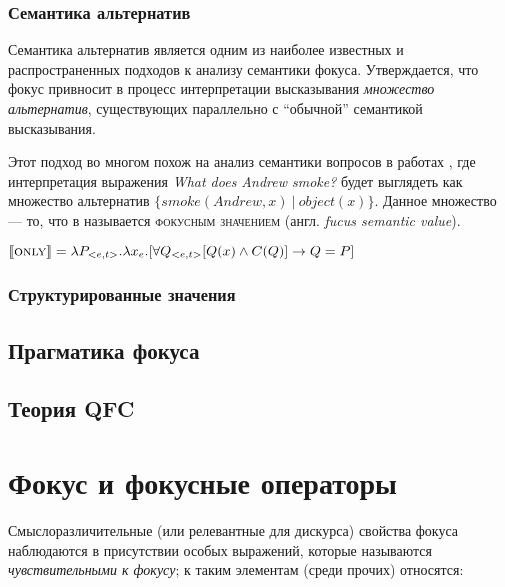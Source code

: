 \documentclass[a4paper, titlepage, 12pt]{article}
\begin{document}
\subsubsection{Семантика альтернатив \citep{rooth1985association,rooth1992theory}} \label{alternativeSemantics}

Семантика альтернатив \citep{rooth1985association,rooth1992theory} является одним из наиболее известных и распространенных подходов к анализу семантики фокуса. Утверждается, что фокус привносит в процесс интерпретации высказывания \textit{множество альтернатив}, существующих параллельно с ``обычной'' семантикой высказывания.

\medskip

Этот подход во многом похож на анализ семантики вопросов в работах \citep{hamblin1973questions,karttunen1977syntax,groenendijk1985semantics}, где интерпретация выражения \textit{What does Andrew smoke?} будет выглядеть как множество альтернатив $ \{ smoke(Andrew, x) \ | \ object(x) \} $. Данное множество --- то, что в \citep{rooth1985association} называется \textsc{фокусным значением} (англ. \textit{fucus semantic value}).

\begin{exe}
    \ex $ \llbracket \textsc{only} \rrbracket = \lambda P_{<e,t>}.\lambda x_{e}.[ \forall Q_{<e,t>} [Q(x) \land C(Q)] \rightarrow Q = P ]$
\end{exe}

\subsubsection{Структурированные значения \citep{Cresswell1985}} \label{structuredMeanings}

\subsection{Прагматика фокуса}

\subsection{Теория QFC \citep{beaver2008sense}} \label{qfcTheory}

\section{Фокус и фокусные операторы}

Смыслоразличительные (или релевантные для дискурса) свойства фокуса наблюдаются в присутствии особых выражений, которые называются \textit{чувствительными к фокусу}; к таким элементам (среди прочих) относятся:
\end{document}
